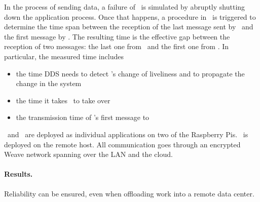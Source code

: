 In the process of sending data, a failure of \proda\ is simulated by abruptly shutting down the application process. Once that happens, a procedure in \cons\ is triggered to determine the time span between the reception of the last message sent by \proda\ and the first message by \prodb . The resulting time is the effective gap between the reception of two messages: the last one from \proda\ and the first one from \prodb . In particular, the measured time includes
\begin{itemize}
  \item the time DDS needs to detect \proda 's change of liveliness and to propagate the change in the system
  \item the time it takes \prodb\ to take over
  \item the transmission time of \prodb 's first message to \cons
\end{itemize} 

\proda\ and \cons\ are deployed as individual applications on two of the Raspberry Pis. \prodb\ is deployed on the remote host. All communication goes through an encrypted Weave network spanning over the LAN and the cloud.







\paragraph{Results.} Reliability can be ensured, even when offloading work into a remote data center.

%
%
%
%
%
%
%
%
%
%
%
%
%
%
%
%
%
%
%
%


